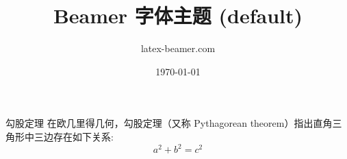 \documentclass{ctexbeamer}
\title{Beamer 字体主题 (default)}
\author{latex-beamer.com}
\date{\today}
\begin{document}
\begin{frame}
  \titlepage 
\end{frame}

\begin{frame}
   
\begin{block}{勾股定理}
在欧几里得几何，勾股定理（又称 Pythagorean theorem）指出直角三角形中三边存在如下关系:
\begin{equation}
  a^{2}+b^{2}=c^{2}
\end{equation}  
\end{block}   
 
\end{frame}
\end{document}
